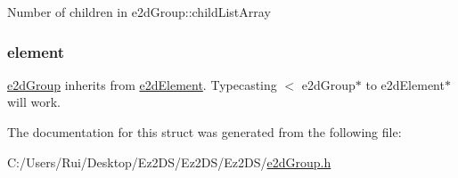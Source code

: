 Number of children in e2d\-Group\-::child\-List\-Array \hypertarget{structe2d_group_a55bc7a3a0af41fba9e5b91f390c5928c}{
\subsubsection[{element}]{ {\bf element}}}\label{structe2d_group_a55bc7a3a0af41fba9e5b91f390c5928c}
\hyperlink{structe2d_group}{e2d\-Group} inherits from \hyperlink{structe2d_element}{e2d\-Element}. Typecasting $<$ e2d\-Group$\ast$ to e2d\-Element$\ast$ will work. 

The documentation for this struct was generated from the following file\-:\begin{DoxyCompactItemize}
\item 
C\-:/\-Users/\-Rui/\-Desktop/\-Ez2\-D\-S/\-Ez2\-D\-S/\-Ez2\-D\-S/\hyperlink{e2d_group_8h}{e2d\-Group.\-h}\end{DoxyCompactItemize}
